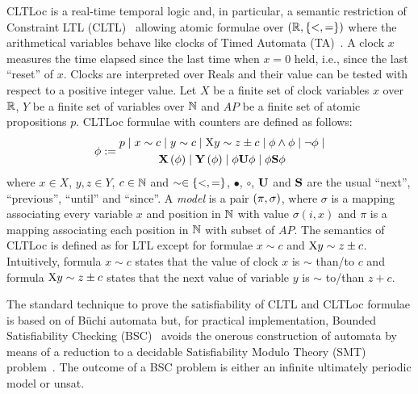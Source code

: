 CLTLoc is a real-time temporal logic and, in particular, a semantic restriction of Constraint LTL (CLTL)~\cite{DD07} allowing atomic formulae over $(\mathbb{R}, \{ <,= \})$ where the arithmetical variables behave like clocks of Timed Automata (TA)~\cite{timed}.
A clock $x$ measures the time elapsed since the last time when $x=0$ held, i.e., since the last ``reset'' of $x$.
Clocks are interpreted over Reals and their value can be tested with respect to a positive integer value.
%
Let $X$ be a finite set of clock variables $x$ over $\mathbb{R}$, $Y$ be a finite set of variables over $\mathbb{N}$ and $AP$ be a finite set of atomic propositions $p$.
CLTLoc formulae with counters are defined as follows:
\begin{equation*}%
  \phi :=
  \begin{gathered}
    p \mid x\sim c \mid y\sim c\mid \aX y\sim z\pm c \mid\phi \wedge \phi \mid \neg \phi \mid \\
       \X{\phi} \mid \Y{\phi} %
\mid \phi\U\phi \mid \phi\Snc\phi
  \end{gathered}
\end{equation*}
where $x \in X$, $y,z \in Y$, $c \in \mathbb{N}$ and 
$\sim \in \{ <,= \}$, $\bullet$, $\circ$, $\mathbf{U}$ and $\mathbf{S}$ are the
usual ``next'', ``previous'', ``until'' and ``since''.
A \textit{model} is a pair $(\pi, \sigma)$, where $\sigma$ is a mapping associating every variable $x$ and position in $\mathbb{N}$ with value $\sigma(i,x)$ and $\pi$ is a mapping associating each position in $\mathbb{N}$ with subset of $AP$. 
The semantics of CLTLoc is defined as for LTL except for formulae $x\sim c$ and $\mathrm{X} y \sim z\pm c$. 
Intuitively, formula $x\sim c$ states that the value of clock $x$ is $\sim$ than/to $c$ and formula $\mathrm{X} y \sim z\pm c$ states that the next value of variable $y$ is $\sim$ to/than $z+c$.

The standard technique to prove the satisfiability of CLTL and CLTLoc formulae is based on of B\"uchi automata \cite{DD07,BRS15} %
but, for practical implementation, Bounded Satisfiability Checking (BSC)~\cite{MPS13} avoids the onerous construction of automata by means of a reduction to a decidable Satisfiability Modulo Theory (SMT) problem~\cite{BRS15}.
The outcome of a BSC problem is either an infinite ultimately periodic model or unsat.

